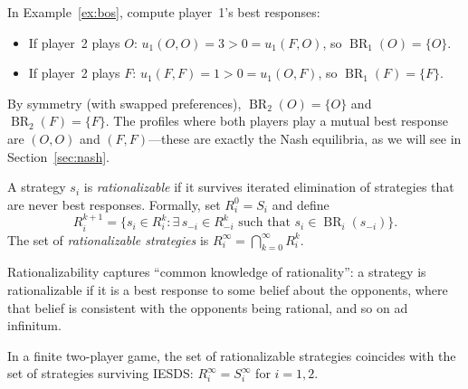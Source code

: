 \documentclass[11pt,a4paper]{article}
\DeclareMathOperator{\BR}{BR}
\begin{document}
\begin{example}
\label{ex:bos_br}
In Example~\ref{ex:bos}, compute player~1's best responses:
\begin{itemize}[nosep]
    \item If player~2 plays $O$: $u_1(O,O) = 3 > 0 = u_1(F,O)$, so
    $\BR_1(O) = \{O\}$.
    \item If player~2 plays $F$: $u_1(F,F) = 1 > 0 = u_1(O,F)$, so
    $\BR_1(F) = \{F\}$.
\end{itemize}
By symmetry (with swapped preferences), $\BR_2(O) = \{O\}$ and
$\BR_2(F) = \{F\}$.  The profiles where both players play a mutual best
response are $(O,O)$ and $(F,F)$---these are exactly the Nash equilibria,
as we will see in Section~\ref{sec:nash}.
\end{example}

\begin{definition}
\label{def:rationalizable}
A strategy $s_i$ is \emph{rationalizable} if it survives iterated
elimination of strategies that are never best responses.  Formally, set
$R_i^0 = S_i$ and define
\[
    R_i^{k+1} = \bigl\{s_i \in R_i^k :
    \exists\, s_{-i} \in R_{-i}^k \text{ such that }
    s_i \in \BR_i(s_{-i})\bigr\}.
\]
The set of \emph{rationalizable strategies} is
$R_i^\infty = \bigcap_{k=0}^\infty R_i^k$.
\end{definition}

\begin{remark}
Rationalizability captures ``common knowledge of rationality'': a strategy
is rationalizable if it is a best response to some belief about the
opponents, where that belief is consistent with the opponents being
rational, and so on ad infinitum.
\end{remark}

\begin{proposition}
\label{prop:iesds_rational}
In a finite two-player game, the set of rationalizable strategies coincides
with the set of strategies surviving IESDS: $R_i^\infty = S_i^\infty$ for
$i = 1, 2$.
\end{proposition}
\end{document}
